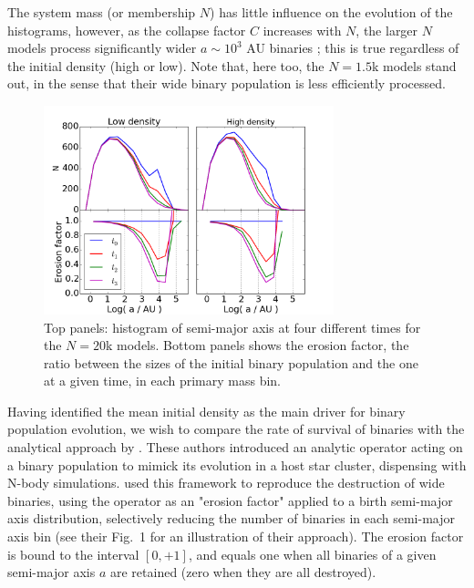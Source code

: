 The system mass (or membership $N$) has little influence on the evolution of the histograms, however, as the collapse factor $C$ increases with $N$, the larger $N$ models process significantly wider $a \sim 10^3$ AU binaries ; this is true regardless of the initial density (high or low). Note that, here too, the $N = 1.5$k models stand out, in the sense that their wide binary population is less efficiently processed.
%

\begin{figure}
\begin{center}
\includegraphics[width=0.75\textwidth]{Figures/6_S_shape}
\caption{Top panels: histogram of semi-major axis at four different times for the $N = 20$k  models. 
Bottom panels shows the erosion factor, the ratio between the sizes of the initial binary population and the one at a given time, in each primary mass bin. }
\label{Fig:6_S_shape}
\end{center}
\end{figure}

Having identified the mean initial density as the main driver for binary population evolution, we wish to compare the rate of survival of binaries with the analytical approach by  \cite{Marks2011}. These authors  introduced an analytic operator acting on a binary population to mimick its evolution in  a host star cluster,  dispensing with N-body simulations.  \cite{Marks2012} used this framework to reproduce the destruction of wide binaries, using the operator as an "erosion  factor" applied to a birth semi-major axis distribution, selectively reducing the number of binaries in each semi-major axis bin (see their Fig.~1 for an illustration of their approach). The erosion factor is bound to the interval $[0, +1]$, and equals one when all binaries of a given semi-major axis $a$ are retained (zero when they are all destroyed). 


